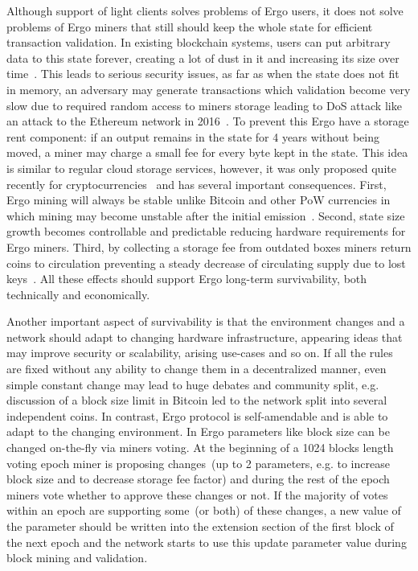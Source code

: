 Although support of light clients solves problems of Ergo users, it does not solve problems
of Ergo miners that still should keep the whole state for efficient
transaction validation.
In existing blockchain systems, users can put arbitrary data to this state forever,
creating a lot of dust in it and increasing its size over time~\cite{perez2019another}.
This leads to serious security issues, as far as when the state does not fit in memory,
an adversary may generate transactions which validation become very slow due to required random
access to miners storage
leading to DoS attack like an attack to the Ethereum network in 2016~\cite{??}.
To prevent this Ergo have a storage rent component: if an
output remains in the state for 4 years without being moved, a miner may charge a small fee for every
byte kept in the state.
This idea is similar to regular cloud storage services, however, it was only proposed quite recently for
cryptocurrencies~\cite{chepurnoy2017space} and has several important consequences.
First, Ergo mining will always be stable unlike Bitcoin and other PoW currencies
in which mining may become unstable after the
initial emission~\cite{carlsten2016instability}.
Second, state size growth becomes controllable and predictable reducing hardware requirements for Ergo miners.
Third, by collecting a storage fee from outdated boxes miners return coins to circulation preventing a steady decrease
of circulating supply due to lost keys~\cite{wsj2018}.
All these effects should support Ergo long-term survivability, both technically and economically.

Another important aspect of survivability is that the environment changes and a network should
adapt to changing hardware infrastructure, appearing ideas that may improve security or
scalability, arising use-cases and so on.
If all the rules are fixed without any ability to change them in a decentralized manner, even
simple constant change may lead to huge debates and community split, e.g. discussion of a block
size limit in Bitcoin led to the network split into several independent coins.
In contrast, Ergo protocol is self-amendable and is able to adapt to the changing environment.
In Ergo parameters like block size can be changed on-the-fly via miners voting.
At the beginning of a 1024 blocks length voting epoch miner is proposing changes~(up to 2 parameters,
e.g. to increase block size and to decrease storage fee factor) and during the rest of the epoch miners
vote whether to approve these changes or not.
If the majority of votes within an epoch are supporting some~(or both) of these changes, a new value of the
parameter should be written into the extension section of the first block of the next epoch and the
network starts to use this update parameter value during block mining and validation.

